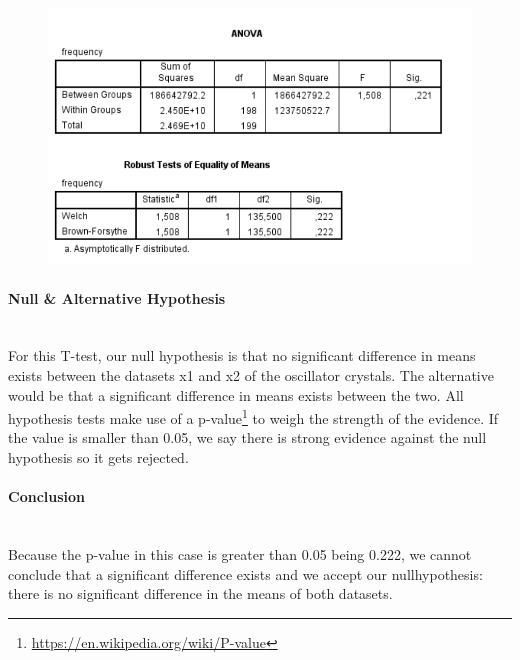 \documentclass[14]{article}
\begin{document}
\begin{figure}[!htb]
	\includegraphics[width=1.0\textwidth]{img/question1/question1_b.PNG}
	\captionsetup{width=1.0\textwidth}
	\centering
\end{figure}

\paragraph{Null \& Alternative Hypothesis}\mbox{}\\
For this T-test, our null hypothesis is that no significant difference in means exists between the datasets x1 and x2 of the oscillator crystals. The alternative would be that a significant difference in means exists between the two. All hypothesis tests make use of a p-value\footnote{\protect\url{https://en.wikipedia.org/wiki/P-value}} to weigh the strength of the evidence. If the value is smaller than 0.05, we say there is strong evidence against the null hypothesis so it gets rejected.

\paragraph{Conclusion}\mbox{}\\
Because the p-value in this case is greater than 0.05 being 0.222, we cannot conclude that a significant difference exists and we accept our nullhypothesis: there is no significant difference in the means of both datasets.\\
\end{document}
